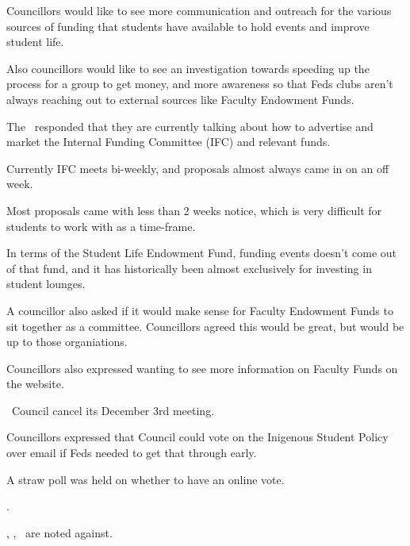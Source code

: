 \begin{information}
    Councillors would like to see more communication and outreach for the 
    various sources of funding that students have available to hold events
    and improve student life. 

    Also councillors would like to see an investigation towards speeding up the
    process for a group to get money, and more awareness so that Feds clubs
    aren't always reaching out to external sources like Faculty Endowment 
    Funds. 

    The \vpi\ responded that they are currently talking about how to advertise
    and market the Internal Funding Committee (IFC) and relevant funds. 
    
    Currently IFC meets bi-weekly, and proposals almost always came in on an
    off week.

    Most proposals came with less than 2 weeks notice, which is very difficult
    for students to work with as a time-frame. 

    In terms of the Student Life Endowment Fund, funding events doesn't come
    out of that fund, and it has historically been almost exclusively for
    investing in student lounges.

    A councillor also asked if it would make sense for Faculty Endowment Funds
    to sit together as a committee. Councillors agreed this would be great,
    but would be up to those organiations. 

    Councillors also expressed wanting to see more information on Faculty
    Funds on the website.
    
\end{information}

\begin{information}
    \birt\ Council cancel its December 3rd meeting.
    \movers{\elizabeth}{\seneca}

    Councillors expressed that Council could vote on the 
    Inigenous Student Policy over email if Feds needed to get that through 
    early.

    A straw poll was held on whether to have an online vote.

    \carries.

    \jason, \alexander, \stephanie\ are noted against.
\end{information}
